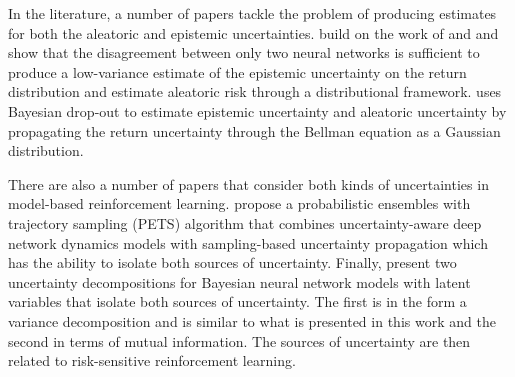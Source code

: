 In the literature, a number of papers tackle the problem of producing estimates for both the aleatoric and epistemic uncertainties. \citet{clements2019estimating} build on the work of \cite{gal2016dropout} and \citet{pearce2018bayesian} and show that the disagreement between only two neural networks is sufficient to produce a low-variance estimate of the epistemic uncertainty on the return distribution and estimate aleatoric risk through a distributional framework. \citet{moerland2017efficient} uses Bayesian drop-out to estimate epistemic uncertainty and aleatoric uncertainty by propagating the return uncertainty through the Bellman equation as a Gaussian distribution. 

There are also a number of papers that consider both kinds of uncertainties in model-based reinforcement learning. \citet{chua2018deep} propose a  probabilistic ensembles with trajectory sampling (PETS) algorithm that combines uncertainty-aware deep network dynamics models with sampling-based uncertainty propagation which has the ability to isolate both sources of uncertainty. Finally, \cite{depeweg2017decomposition} present two uncertainty decompositions for Bayesian neural network models with latent variables that isolate both sources of uncertainty. The first is in the form a variance decomposition and is similar to what is presented in this work and the second in terms of mutual information. The sources of uncertainty are then related to risk-sensitive reinforcement learning.